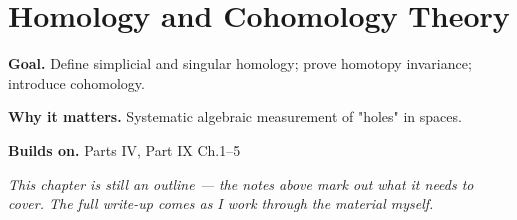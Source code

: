 \chapter{Homology and Cohomology Theory}
\label{ch:09-topology-06}

\begin{chapterintro}
\textbf{Goal.} Define simplicial and singular homology; prove homotopy invariance; introduce cohomology.

\textbf{Why it matters.} Systematic algebraic measurement of "holes" in spaces.

\textbf{Builds on.} Parts IV, Part IX Ch.1–5
\end{chapterintro}

\textit{This chapter is still an outline --- the notes above mark out what it needs to cover. The full write-up comes as I work through the material myself.}
